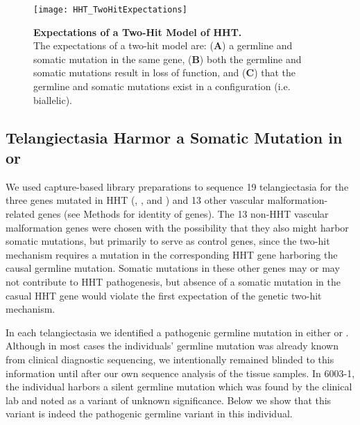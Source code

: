 \begin{figure}[tbp!]
\begin{center}
\texttt{[image: HHT\_TwoHitExpectations]}
\end{center}
\caption[Expectations of a Two-Hit Model of HHT] {\textbf{Expectations of a Two-Hit Model of HHT.}\\ The expectations of a two-hit model are: (\textbf{A}) a germline and somatic mutation in the same gene, (\textbf{B}) both the germline and somatic mutations result in loss of function, and (\textbf{C}) that the germline and somatic mutations exist in a  configuration (i.e. biallelic). }

\label{HHT_TwoHitExpectations}
\end{figure}

\subsection{Telangiectasia Harmor a Somatic Mutation in  or }
We used capture-based library preparations to sequence 19 telangiectasia for the three genes mutated in HHT (, , and ) and 13 other vascular malformation-related genes (see Methods for identity of genes). The 13 non-HHT vascular malformation genes were chosen with the possibility that they also might harbor somatic mutations, but primarily to serve as control genes, since the two-hit mechanism requires a mutation in the corresponding HHT gene harboring the causal germline mutation.  Somatic mutations in these other genes may or may not contribute to HHT pathogenesis, but absence of a somatic mutation in the casual HHT gene would violate the first expectation of the genetic two-hit mechanism.

In each telangiectasia we identified a pathogenic germline mutation in either  or .   Although in most cases the individuals’ germline mutation was already known from clinical diagnostic sequencing, we intentionally remained blinded to this information until after our own sequence analysis of the tissue samples.  In 6003-1, the individual harbors a silent germline mutation which was found by the clinical lab and noted as a variant of unknown significance.  Below we show that this variant is indeed the pathogenic germline variant in this individual.

